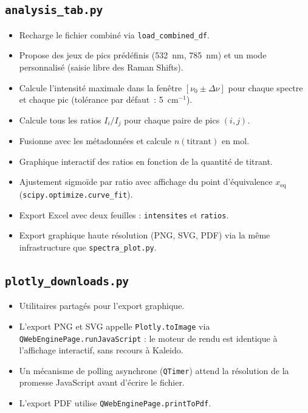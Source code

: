 \documentclass[12pt, a4paper]{article}
\newcommand{\cm}{cm$^{-1}$}
\begin{document}
\subsection{\texttt{analysis\_tab.py}}

\begin{itemize}
  \item Recharge le fichier combiné via \texttt{load\_combined\_df}.
  \item Propose des jeux de pics prédéfinis (532~nm, 785~nm) et un mode
        personnalisé (saisie libre des Raman Shifts).
  \item Calcule l'intensité maximale dans la fenêtre $[\nu_0 \pm \Delta\nu]$
        pour chaque spectre et chaque pic (tolérance par défaut~: 5~\cm).
  \item Calcule tous les ratios $I_i / I_j$ pour chaque paire de pics $(i, j)$.
  \item Fusionne avec les métadonnées et calcule $n(\text{titrant})$ en mol.
  \item Graphique interactif des ratios en fonction de la quantité de titrant.
  \item Ajustement sigmoïde par ratio avec affichage du point d'équivalence
        $x_\text{eq}$ (\texttt{scipy.optimize.curve\_fit}).
  \item Export Excel avec deux feuilles : \texttt{intensites} et
        \texttt{ratios}.
  \item Export graphique haute résolution (PNG, SVG, PDF) via la même
        infrastructure que \texttt{spectra\_plot.py}.
\end{itemize}

\subsection{\texttt{plotly\_downloads.py}}

\begin{itemize}
  \item Utilitaires partagés pour l'export graphique.
  \item L'export PNG et SVG appelle \texttt{Plotly.toImage} via
        \texttt{QWebEnginePage.runJavaScript} : le moteur de rendu est
        identique à l'affichage interactif, sans recours à Kaleido.
  \item Un mécanisme de polling asynchrone (\texttt{QTimer}) attend la
        résolution de la promesse JavaScript avant d'écrire le fichier.
  \item L'export PDF utilise \texttt{QWebEnginePage.printToPdf}.
\end{itemize}
\end{document}
